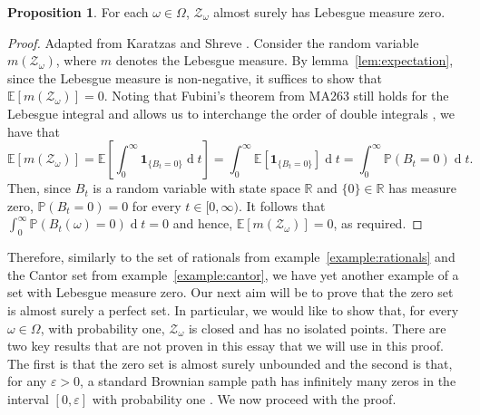 \documentclass[a4paper,11pt]{article}
\DeclareMathOperator{\dee}{d}
\theoremstyle{plain}
\theoremstyle{definition}
\newtheorem{proposition}[theorem]{Proposition}
\begin{document}

\begin{proposition}
For each $\omega \in \Omega$, $\mathcal{Z}_\omega$ almost surely has Lebesgue measure zero.
\end{proposition}

\begin{proof} Adapted from Karatzas and Shreve \citep[p.~105]{IK}.
Consider the random variable $m(\mathcal{Z}_\omega)$, where $m$ denotes the Lebesgue measure. By lemma~\ref{lem:expectation}, since the Lebesgue measure is non-negative, it suffices to show that $\mathbb{E}[m(\mathcal{Z}_\omega)] = 0$. Noting that Fubini's theorem from MA263 still holds for the Lebesgue integral and allows us to interchange the order of double integrals \citep[p.~171]{MC}, we have that
\[
\mathbb{E}[m(\mathcal{Z}_\omega)] = \mathbb{E} \left[\int_{0}^{\infty} \mathbf{1}_{\{B_t = 0\}} {\dee}t \right] = \int_{0}^{\infty} \mathbb{E}[\mathbf{1}_{\{B_t = 0\}}]{\dee}t = \int_{0}^{\infty} \mathbb{P}(B_t = 0){\dee}t.
\]
Then, since $B_t$ is a random variable with state space $\mathbb{R}$ and $\{0\} \in \mathbb{R}$ has measure zero, $\mathbb{P}(B_t = 0) = 0$ for every $t \in [0,\infty)$. It follows that $\int_{0}^{\infty} \mathbb{P}(B_t(\omega) = 0){\dee}t = 0$ and hence, $\mathbb{E}[m(\mathcal{Z}_\omega)] = 0$, as required.
\end{proof}

Therefore, similarly to the set of rationals from example~\ref{example:rationals} and the Cantor set from example~\ref{example:cantor}, we have yet another example of a set with Lebesgue measure zero. Our next aim will be to prove that the zero set is almost surely a perfect set. In particular, we would like to show that, for every $\omega \in \Omega$, with probability one, $\mathcal{Z}_\omega$ is closed and has no isolated points. There are two key results that are not proven in this essay that we will use in this proof. The first is that the zero set is almost surely unbounded and the second is that, for any $\varepsilon > 0$, a standard Brownian sample path has infinitely many zeros in the interval $[0,\varepsilon]$ with probability one \citep[pp.~104--105]{IK}. We now proceed with the proof.

\end{document}
